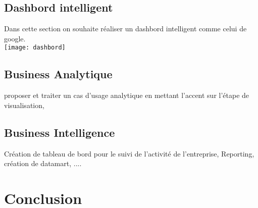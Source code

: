 \documentclass[french,a4paper,11pt,oneside]{book}
\begin{document}
{		\subsection{Dashbord intelligent}{
			Dans cette section on souhaite réaliser un dashbord intelligent comme celui de google.\\
			\texttt{[image: dashbord]}
			
			
		}

		\subsection{Business Analytique}{
			proposer et traiter un cas d’usage analytique en mettant l’accent sur l’étape de visualisation,
		
		}
	
		\subsection{Business Intelligence}{
			Création de tableau de bord pour le suivi de l’activité de l’entreprise, Reporting, création de datamart, ....
		
		}
		

	}
	
	\section{Conclusion}{
	
	}


	
	
\end{document}
